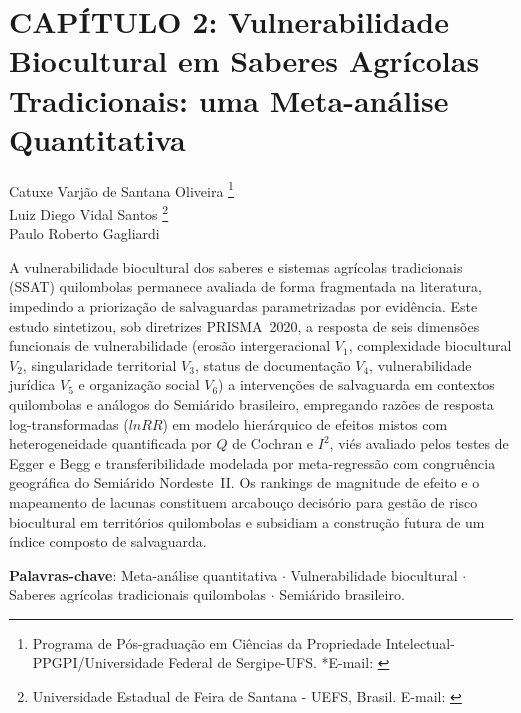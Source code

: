 \pagestyle{plain}

\chapter{CAPÍTULO 2: Vulnerabilidade Biocultural em Saberes Agrícolas Tradicionais: uma Meta-análise Quantitativa}

\begin{flushright}
Catuxe Varjão de Santana Oliveira  \footnote[1]{Programa de Pós-graduação em Ciências da Propriedade Intelectual-PPGPI/Universidade Federal de Sergipe-UFS. *E-mail:  \href{mailto:catuxe@academico.ufs.br}{}}
\\[0.3cm]
Luiz Diego Vidal Santos \footnote[2]{Universidade Estadual de Feira de Santana - UEFS, Brasil. E-mail: \href{mailto:ldvsantos@uefs.br}{}}
\\[0.3cm]
Paulo Roberto Gagliardi \footnotemark[1]
\end{flushright}

{\renewcommand{\PRIVATEbookmarkthis}[1]{}%
\begin{resumoumacoluna}
A vulnerabilidade biocultural dos saberes e sistemas agrícolas tradicionais (SSAT) quilombolas permanece avaliada de forma fragmentada na literatura, impedindo a priorização de salvaguardas parametrizadas por evidência. Este estudo sintetizou, sob diretrizes PRISMA~2020, a resposta de seis dimensões funcionais de vulnerabilidade (erosão intergeracional $V_{1}$, complexidade biocultural $V_{2}$, singularidade territorial $V_{3}$, status de documentação $V_{4}$, vulnerabilidade jurídica $V_{5}$ e organização social $V_{6}$) a intervenções de salvaguarda em contextos quilombolas e análogos do Semiárido brasileiro, empregando razões de resposta log-transformadas ($lnRR$) em modelo hierárquico de efeitos mistos com heterogeneidade quantificada por $Q$ de Cochran e $I^{2}$, viés avaliado pelos testes de Egger e Begg e transferibilidade modelada por meta-regressão com congruência geográfica do Semiárido Nordeste~II. Os rankings de magnitude de efeito e o mapeamento de lacunas constituem arcabouço decisório para gestão de risco biocultural em territórios quilombolas e subsidiam a construção futura de um índice composto de salvaguarda.

\vspace{\onelineskip}
\noindent
\textbf{Palavras-chave}: Meta-análise quantitativa $\cdot$ Vulnerabilidade biocultural $\cdot$ Saberes agrícolas tradicionais quilombolas $\cdot$ Semiárido brasileiro.
\end{resumoumacoluna}}

